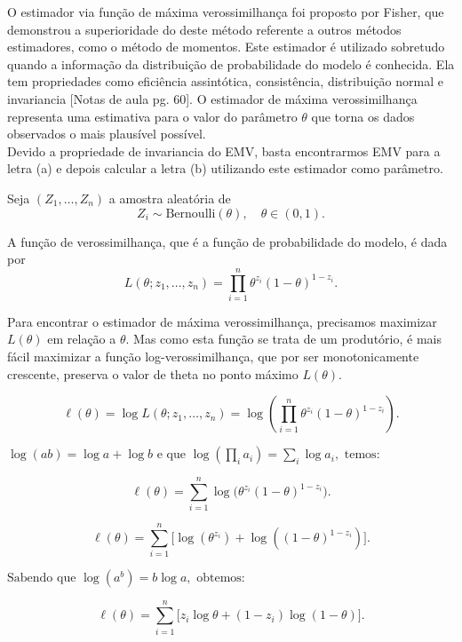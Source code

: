 O estimador via função de máxima verossimilhança foi proposto por Fisher, que demonstrou a superioridade do deste método referente a outros métodos estimadores, como o método de momentos. 
Este estimador é utilizado sobretudo quando a informação da distribuição de probabilidade do modelo é conhecida. 
Ela tem propriedades como eficiência assintótica, consistência, distribuição normal e invariancia [Notas de aula pg. 60]. 
O estimador de máxima verossimilhança representa uma estimativa para o valor do parâmetro $\theta$ que torna os dados observados o mais plausível possível. 
\\[0.5em]
Devido a propriedade de invariancia do EMV, basta encontrarmos EMV para a letra (a) e depois calcular a letra (b) utilizando este estimador como parâmetro.


Seja \( (Z_1, \dots, Z_n) \) a amostra aleatória de 
\[
Z_i \sim \mathrm{Bernoulli}(\theta), \quad \theta \in (0,1).
\]

A função de verossimilhança, que é a função de probabilidade do modelo, é dada por
\[
L(\theta; z_1, \dots, z_n)
= \prod_{i=1}^n \theta^{z_i}(1-\theta)^{1-z_i}.
\]

Para encontrar o estimador de máxima verossimilhança, precisamos maximizar \( L(\theta) \) em relação a \( \theta \). Mas como esta função se trata de um produtório,
é mais fácil maximizar a função log-verossimilhança, que por ser monotonicamente crescente, preserva o valor de theta no ponto máximo \( L(\theta) \).



\[
\ell(\theta)
= \log L(\theta; z_1, \ldots, z_n)
= \log\!\left(\prod_{i=1}^{n} \theta^{z_i}(1-\theta)^{1-z_i}\right).
\]


\(
\log(ab) = \log a + \log b \text{ e que } 
\log\!\left(\prod_i a_i\right) = \sum_i \log a_i, \text{ temos:}
\)

\[
\ell(\theta)
= \sum_{i=1}^{n} \log\!\big(\theta^{z_i}(1-\theta)^{1-z_i}\big).
\]


\[
\ell(\theta)
= \sum_{i=1}^{n} \big[\log(\theta^{z_i}) + \log((1-\theta)^{1-z_i})\big].
\]

\(
\text{Sabendo que } \log(a^b) = b\log a, \text{ obtemos:}
\)

\[
\ell(\theta)
= \sum_{i=1}^{n} \big[z_i \log \theta + (1 - z_i)\log(1-\theta)\big].
\]


